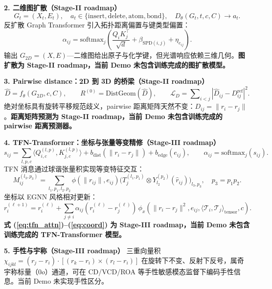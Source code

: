 \documentclass[10pt,a4paper]{ctexart}
\begin{document}
\vspace{2pt}
\textbf{2. 二维图扩散（Stage-II roadmap）}
\[
G_t = (X_t, E_t),\quad a_t \in \{\mathrm{insert}, \mathrm{delete}, \mathrm{atom}, \mathrm{bond}\},\quad
D_\theta(G_t, t, c, C) \rightarrow a_t.
\]
反扩散 Graph Transformer 引入拓扑距离偏置与键类型偏置：
\[
\alpha_{ij} = \mathrm{softmax}_j\!\left(\frac{Q_i K_j^\top}{\sqrt d} + \beta_{\mathrm{SPD}(i,j)} + \eta_{e_{ij}}\right).
\]
输出 $G_{2D} = (X, E)$---二维图给出原子与化学键，但光谱响应依赖三维几何。\textbf{图扩散为 Stage-II roadmap，当前 Demo 未包含训练完成的图扩散模型。}

\vspace{2pt}
\textbf{3. Pairwise distance：2D 到 3D 的桥梁（Stage-II roadmap）}
\[
\hat D = f_\theta(G_{2D}, c, C),\qquad
R^{(0)} = \mathrm{DistGeom}(\hat D),\qquad
\mathcal L_D = \sum\nolimits_{i<j} |\hat D_{ij} - D_{ij}^{\mathrm{ref}}|^2.
\]
绝对坐标具有旋转平移规范歧义，pairwise 距离矩阵天然不变：$D_{ij} = \|r_i - r_j\|$。\textbf{距离矩阵预测为 Stage-II roadmap，当前 Demo 未包含训练完成的 pairwise 距离预测器。}

\vspace{2pt}
\textbf{4. TFN-Transformer：坐标与张量等变精修（Stage-III roadmap）}
\begin{equation}\label{eq:tfn_attn}
s_{ij} = \sum_{l,p,c} \langle Q_{i,c}^{(l,p)}, K_{j,c}^{(l,p)} \rangle
        + b_{\mathrm{dist}}(\|r_i - r_j\|) + b_{\mathrm{edge}}(e_{ij}),\qquad
\alpha_{ij} = \mathrm{softmax}_j(s_{ij}).
\end{equation}
TFN 消息通过球谐张量积实现等变特征交互：
\[
M_{ij}^{(l_3,p_3)} = \sum_{l_1,p_1,l_2,p_2} \phi(\|r_{ij}\|, e_{ij})
                     \bigl(T_j^{(l_1,p_1)} \otimes Y_{l_2}^{(p_2)}(\hat r_{ij})\bigr)_{l_3,p_3},\quad
p_3 = p_1 p_2.
\]
坐标以 EGNN 风格相对更新：
\begin{equation}\label{eq:coord}
r_i^{(\ell+1)} = r_i^{(\ell)} + \sum_{j \neq i} \alpha_{ij} (r_i^{(\ell)} - r_j^{(\ell)})\,
                 \phi_x(\|r_i - r_j\|^2, e_{ij}, \langle\mathcal T_i, \mathcal T_j\rangle_{\mathrm{tensor}}, c).
\end{equation}
\textbf{式 (\ref{eq:tfn_attn})--(\ref{eq:coord}) 为 Stage-III roadmap，当前 Demo 未包含训练完成的 TFN-Transformer 模型。}

\vspace{2pt}
\textbf{5. 手性与宇称（Stage-III roadmap）}
三重向量积 $\chi_{ijkl} = (r_j - r_i) \cdot [(r_k - r_i) \times (r_l - r_i)]$ 在旋转下不变、反射下反号，属奇宇称标量（$0o$）通道，可在 CD/VCD/ROA 等手性敏感模态监督下编码手性信息。当前 Demo 未实现手性区分。
\end{document}
